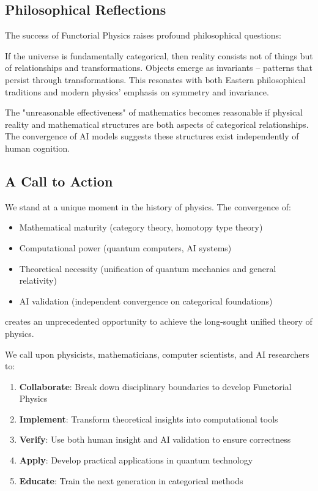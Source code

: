 \subsection{Philosophical Reflections}

The success of Functorial Physics raises profound philosophical questions:

\begin{remark}
If the universe is fundamentally categorical, then reality consists not of things but of relationships and transformations. Objects emerge as invariants -- patterns that persist through transformations. This resonates with both Eastern philosophical traditions and modern physics' emphasis on symmetry and invariance.
\end{remark}

\begin{remark}
The "unreasonable effectiveness" of mathematics becomes reasonable if physical reality and mathematical structures are both aspects of categorical relationships. The convergence of AI models suggests these structures exist independently of human cognition.
\end{remark}

\subsection{A Call to Action}

We stand at a unique moment in the history of physics. The convergence of:
\begin{itemize}[leftmargin=*]
\item Mathematical maturity (category theory, homotopy type theory)
\item Computational power (quantum computers, AI systems)
\item Theoretical necessity (unification of quantum mechanics and general relativity)
\item AI validation (independent convergence on categorical foundations)
\end{itemize}
creates an unprecedented opportunity to achieve the long-sought unified theory of physics.

We call upon physicists, mathematicians, computer scientists, and AI researchers to:

\begin{enumerate}[leftmargin=*]
\item \textbf{Collaborate}: Break down disciplinary boundaries to develop Functorial Physics
\item \textbf{Implement}: Transform theoretical insights into computational tools
\item \textbf{Verify}: Use both human insight and AI validation to ensure correctness
\item \textbf{Apply}: Develop practical applications in quantum technology
\item \textbf{Educate}: Train the next generation in categorical methods
\end{enumerate}

